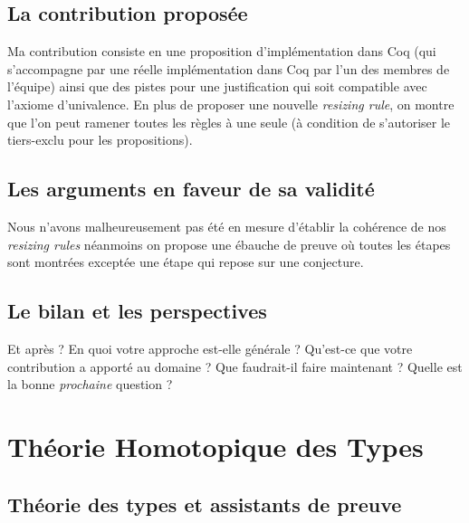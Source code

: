 \documentclass[11pt]{article}
\begin{document}
\subsection*{La contribution proposée}

Ma contribution consiste en une proposition d'implémentation dans Coq
(qui s'accompagne par une réelle implémentation dans Coq par l'un des membres
de l'équipe) ainsi que des pistes pour une justification qui soit compatible
avec l'axiome d'univalence. En plus de proposer une nouvelle \emph{resizing
rule}, on montre que l'on peut ramener toutes les règles à une seule (à
condition de s'autoriser le tiers-exclu pour les propositions).

\subsection*{Les arguments en faveur de sa validité}

Nous n'avons malheureusement pas été en mesure d'établir la cohérence de nos
\emph{resizing rules} néanmoins on propose une ébauche de preuve où toutes les
étapes sont montrées exceptée une étape qui repose sur une conjecture.

\subsection*{Le bilan et les perspectives}

Et après ? En quoi votre approche est-elle générale ?
Qu'est-ce que votre contribution a apporté au domaine ?
Que faudrait-il faire maintenant ?
Quelle est la bonne \emph{prochaine} question ?

\newpage

\section{Théorie Homotopique des Types}

\subsection{Théorie des types et assistants de preuve}
\end{document}
